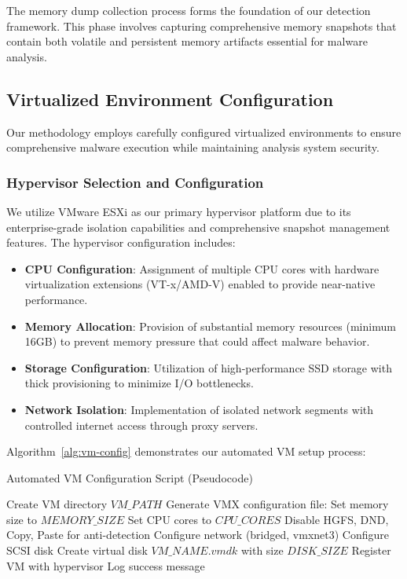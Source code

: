 The memory dump collection process forms the foundation of our detection framework. This phase involves capturing comprehensive memory snapshots that contain both volatile and persistent memory artifacts essential for malware analysis.

\subsection{Virtualized Environment Configuration}
\label{subsec:environment-config}

Our methodology employs carefully configured virtualized environments to ensure comprehensive malware execution while maintaining analysis system security.

\subsubsection{Hypervisor Selection and Configuration}

We utilize VMware ESXi as our primary hypervisor platform due to its enterprise-grade isolation capabilities and comprehensive snapshot management features. The hypervisor configuration includes:

\begin{itemize}
    \item \textbf{CPU Configuration}: Assignment of multiple CPU cores with hardware virtualization extensions (VT-x/AMD-V) enabled to provide near-native performance.
    
    \item \textbf{Memory Allocation}: Provision of substantial memory resources (minimum 16GB) to prevent memory pressure that could affect malware behavior.
    
    \item \textbf{Storage Configuration}: Utilization of high-performance SSD storage with thick provisioning to minimize I/O bottlenecks.
    
    \item \textbf{Network Isolation}: Implementation of isolated network segments with controlled internet access through proxy servers.
\end{itemize}

Algorithm~\ref{alg:vm-config} demonstrates our automated VM setup process:

\begin{algorithm}[!htbp]
\caption{Automated VM Configuration Script (Pseudocode)}
\label{alg:vm-config}
\begin{algorithmic}[1]
    \State Create VM directory $VM\_PATH$
    \State Generate VMX configuration file:
    \State \quad Set memory size to $MEMORY\_SIZE$
    \State \quad Set CPU cores to $CPU\_CORES$
    \State \quad Disable HGFS, DND, Copy, Paste for anti-detection
    \State \quad Configure network (bridged, vmxnet3)
    \State \quad Configure SCSI disk
    \State Create virtual disk $VM\_NAME.vmdk$ with size $DISK\_SIZE$
    \State Register VM with hypervisor
    \State Log success message
\EndProcedure
\end{algorithmic}
\end{algorithm}

